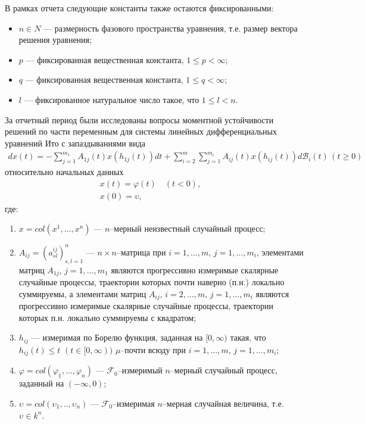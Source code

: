 В рамках отчета следующие константы также остаются фиксированными:
\begin{itemize}
    \item $n \in N$ --- размерность фазового пространства уравнения, т.е. размер вектора решения уравнения;
    \item $p$ --- фиксированная вещественная константа, $1 \le  p < \infty $;
    \item $q$ --- фиксированная вещественная константа, $1 \le  q < \infty $;
    \item $l$ --- фиксированное натуральное число такое, что $1 \le  l < n$.
\end{itemize}

За отчетный период были исследованы вопросы моментной устойчивости
решений по части переменным для системы линейных дифференциальных
уравнений Ито с запаздываниями вида
\begin{equation}
\label{eq:kri-1}
\begin{array}{crl}
dx(t) = - \sum \limits_{j=1}^{m_1}A_{1j}(t)x(h_{1j}(t))dt + \sum
\limits_{i=2}^m\sum
\limits_{j=1}^{m_i}A_{ij}(t)x(h_{ij}(t))d\mathcal B_i(t) \, (t \ge
0)
\end{array}
\end{equation}
относительно начальных данных
\begin{gather}
\label{eq:kri-1a}
x(t) = \varphi(t) \quad (t <0), \quad
\\
\label{eq:kri-1b}
x(0) = \upsilon,
\end{gather}
где:
\begin{enumerate}
    \item $x = col(x^1,\dots,x^n)$ --- $n$--мерный неизвестный случайный
    процесс;

    \item  $A_{ij} = (a^{ij}_{sl})^n_{s,l=1}$ --- $n \times n$--матрица при
    $i = 1,\dots,m$, $j = 1,\dots,m_i$, элементами матриц $A_{1j}$, $j =
    1,\dots,m_1$ являются прогрессивно измеримые скалярные случайные
    процессы, траектории которых почти наверно (п.н.) локально
    суммируемы, а элементами матриц $A_{ij}$, $i = 2,\dots,m$, $j =
    1,\dots,m_i$ являются прогрессивно измеримые скалярные случайные
    процессы, траектории которых п.н. локально суммируемы с квадратом;

    \item  $ h_{ij}$ --- измеримая по Борелю функция, заданная на $[0,
    \infty)$ такая, что $ h_{ij}(t)\leq t {\,} {\,} (t \in [0, \infty))$
    $\mu $--почти всюду при $i = 1,\dots,m$, $j = 1,\dots,m_i$;

    \item  $\varphi = col (\varphi _1,\dots, \varphi _n)$ --- ${\mathcal
    F}_0$--измеримый $n$--мерный случайный процесс, заданный на
    $(-\infty , 0)$;

    \item  $\upsilon = col (\upsilon_1,.., \upsilon_n)$ --- ${\mathcal
    F}_0$--измеримая $n$--мерная случайная величина, т.е. $\upsilon \in
    k^n$.
\end{enumerate}


